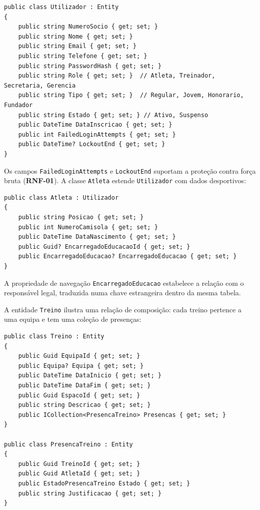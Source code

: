 \begin{lstlisting}[language={[Sharp]C},basicstyle=\ttfamily\small,breaklines=true,frame=single,caption={Classe \texttt{Utilizador} --- entidade base da hierarquia de utilizadores.},label={lst:utilizador}]
public class Utilizador : Entity
{
    public string NumeroSocio { get; set; }
    public string Nome { get; set; }
    public string Email { get; set; }
    public string Telefone { get; set; }
    public string PasswordHash { get; set; }
    public string Role { get; set; }  // Atleta, Treinador, Secretaria, Gerencia
    public string Tipo { get; set; }  // Regular, Jovem, Honorario, Fundador
    public string Estado { get; set; } // Ativo, Suspenso
    public DateTime DataInscricao { get; set; }
    public int FailedLoginAttempts { get; set; }
    public DateTime? LockoutEnd { get; set; }
}
\end{lstlisting}

Os campos \texttt{FailedLoginAttempts} e \texttt{LockoutEnd} suportam a proteção contra força bruta (\textbf{RNF-01}). A classe \texttt{Atleta} estende \texttt{Utilizador} com dados desportivos:

\begin{lstlisting}[language={[Sharp]C},basicstyle=\ttfamily\small,breaklines=true,frame=single,caption={Classe \texttt{Atleta} --- extensão de \texttt{Utilizador} com dados desportivos.},label={lst:atleta}]
public class Atleta : Utilizador
{
    public string Posicao { get; set; }
    public int NumeroCamisola { get; set; }
    public DateTime DataNascimento { get; set; }
    public Guid? EncarregadoEducacaoId { get; set; }
    public EncarregadoEducacao? EncarregadoEducacao { get; set; }
}
\end{lstlisting}

A propriedade de navegação \texttt{EncarregadoEducacao} estabelece a relação com o responsável legal, traduzida numa chave estrangeira dentro da mesma tabela.

A entidade \texttt{Treino} ilustra uma relação de composição: cada treino pertence a uma equipa e tem uma coleção de presenças:

\begin{lstlisting}[language={[Sharp]C},basicstyle=\ttfamily\small,breaklines=true,frame=single,caption={Entidades \texttt{Treino} e \texttt{PresencaTreino} do módulo desportivo.},label={lst:treino}]
public class Treino : Entity
{
    public Guid EquipaId { get; set; }
    public Equipa? Equipa { get; set; }
    public DateTime DataInicio { get; set; }
    public DateTime DataFim { get; set; }
    public Guid EspacoId { get; set; }
    public string Descricao { get; set; }
    public ICollection<PresencaTreino> Presencas { get; set; }
}

public class PresencaTreino : Entity
{
    public Guid TreinoId { get; set; }
    public Guid AtletaId { get; set; }
    public EstadoPresencaTreino Estado { get; set; }
    public string Justificacao { get; set; }
}
\end{lstlisting}

